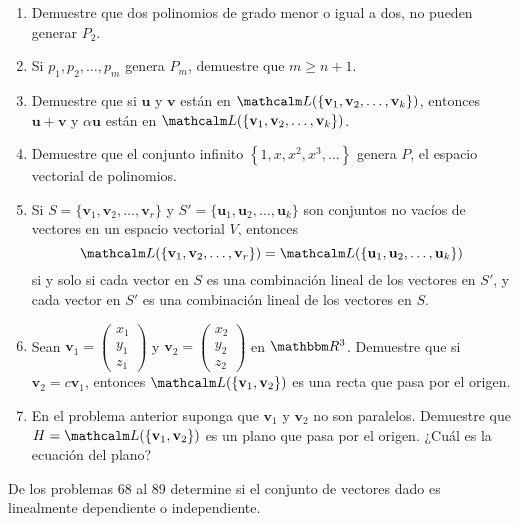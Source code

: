 \begin{enumerate}[start=61]
    \item Demuestre que dos polinomios de grado menor o igual a dos, no pueden generar $P_{2}$.
    \item Si $p_{1}, p_{2}, \dots, p_{m}$ genera $P_{m}$, demuestre que $m \geq n+1$.
    \item Demuestre que si $\mathbf{u}$ y $\mathbf{v}$ están en $\Gen (\{\mathbf{v}_{1}, \mathbf{v}_{2}, \dots, \mathbf{v}_{k}\})$, entonces $\mathbf{u}+\mathbf{v}$ y $\alpha \mathbf{u}$ están en $\Gen (\{\mathbf{v}_{1}, \mathbf{v}_{2}, \dots, \mathbf{v}_{k}\})$.
    \item Demuestre que el conjunto infinito $\left\{1, x, x^{2}, x^{3}, \dots\right\}$ genera $P$, el espacio vectorial de polinomios.
    \item Si $S = \{\mathbf{v}_1, \mathbf{v}_2, \dots, \mathbf{v}_r\}$ y $S' = \{\mathbf{u}_1, \mathbf{u}_2, \dots, \mathbf{u}_k\}$ son conjuntos no vacíos de vectores en un espacio vectorial $V$, entonces
    $$\Gen (\{\mathbf{v}_1, \mathbf{v}_2, \dots, \mathbf{v}_r\}) = \Gen (\{\mathbf{u}_1, \mathbf{u}_2, \dots, \mathbf{u}_k\})$$
    si y solo si cada vector en $S$ es una combinación lineal de los vectores en $S'$, y cada vector en $S'$ es una combinación lineal de los vectores en $S$.
    \item Sean $\mathbf{v}_{1}=\begin{pmatrix} x_{1} \\ y_{1} \\ z_{1} \end{pmatrix}$ y $\mathbf{v}_{2}=\begin{pmatrix} x_{2} \\ y_{2} \\ z_{2} \end{pmatrix}$ en $\RR[3]$. Demuestre que si $\mathbf{v}_{2}=c \mathbf{v}_{1}$, entonces $\Gen (\{\mathbf{v}_{1}, \mathbf{v}_{2}\})$ es una recta que pasa por el origen.
    \item En el problema anterior suponga que $\mathbf{v}_{1}$ y $\mathbf{v}_{2}$ no son paralelos. Demuestre que $H= \Gen (\{\mathbf{v}_{1}, \mathbf{v}_{2}\})$ es un plano que pasa por el origen. ¿Cuál es la ecuación del plano?
\end{enumerate}
De los problemas 68 al 89 determine si el conjunto de vectores dado es linealmente dependiente o independiente.
